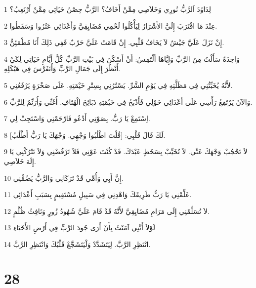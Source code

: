\par 1 لِدَاوُدَ اَلرَّبُّ نُورِي وَخَلاَصِي مِمَّنْ أَخَافُ؟ الرَّبُّ حِصْنُ حَيَاتِي مِمَّنْ أَرْتَعِبُ؟
\par 2 عِنْدَ مَا اقْتَرَبَ إِلَيَّ الأَشْرَارُ لِيَأْكُلُوا لَحْمِي مُضَايِقِيَّ وَأَعْدَائِي عَثَرُوا وَسَقَطُوا.
\par 3 إِنْ نَزَلَ عَلَيَّ جَيْشٌ لاَ يَخَافُ قَلْبِي. إِنْ قَامَتْ عَلَيَّ حَرْبٌ فَفِي ذَلِكَ أَنَا مُطْمَئِنٌّ.
\par 4 وَاحِدَةً سَأَلْتُ مِنَ الرَّبِّ وَإِيَّاهَا أَلْتَمِسُ: أَنْ أَسْكُنَ فِي بَيْتِ الرَّبِّ كُلَّ أَيَّامِ حَيَاتِي لِكَيْ أَنْظُرَ إِلَى جَمَالِ الرَّبِّ وَأَتَفَرَّسَ فِي هَيْكَلِهِ.
\par 5 لأَنَّهُ يُخَبِّئُنِي فِي مَظَلَّتِهِ فِي يَوْمِ الشَّرِّ. يَسْتُرُنِي بِسِتْرِ خَيْمَتِهِ. عَلَى صَخْرَةٍ يَرْفَعُنِي.
\par 6 وَالآنَ يَرْتَفِعُ رَأْسِي عَلَى أَعْدَائِي حَوْلِي فَأَذْبَحُ فِي خَيْمَتِهِ ذَبَائِحَ الْهُتَافِ. أُغَنِّي وَأُرَنِّمُ لِلرَّبِّ.
\par 7 اِسْتَمِعْ يَا رَبُّ. بِصَوْتِي أَدْعُو فَارْحَمْنِي وَاسْتَجِبْ لِي.
\par 8 لَكَ قَالَ قَلْبِي: [قُلْتَ اطْلُبُوا وَجْهِي. وَجْهَكَ يَا رَبُّ أَطْلُبُ].
\par 9 لاَ تَحْجُبْ وَجْهَكَ عَنِّي. لاَ تُخَيِّبْ بِسَخَطٍ عَبْدَكَ. قَدْ كُنْتَ عَوْنِي فَلاَ تَرْفُضْنِي وَلاَ تَتْرُكْنِي يَا إِلَهَ خَلاَصِي.
\par 10 إِنَّ أَبِي وَأُمِّي قَدْ تَرَكَانِي وَالرَّبُّ يَضُمُّنِي.
\par 11 عَلِّمْنِي يَا رَبُّ طَرِيقَكَ وَاهْدِنِي فِي سَبِيلٍ مُسْتَقِيمٍ بِسَبَبِ أَعْدَائِي.
\par 12 لاَ تُسَلِّمْنِي إِلَى مَرَامِ مُضَايِقِيَّ لأَنَّهُ قَدْ قَامَ عَلَيَّ شُهُودُ زُورٍ وَنَافِثُ ظُلْمٍ.
\par 13 لَوْلاَ أَنَّنِي آمَنْتُ بِأَنْ أَرَى جُودَ الرَّبِّ فِي أَرْضِ الأَحْيَاءِ
\par 14 انْتَظِرِ الرَّبَّ. لِيَتَشَدَّدْ وَلْيَتَشَجَّعْ قَلْبُكَ وَانْتَظِرِ الرَّبَّ.

\chapter{28}


